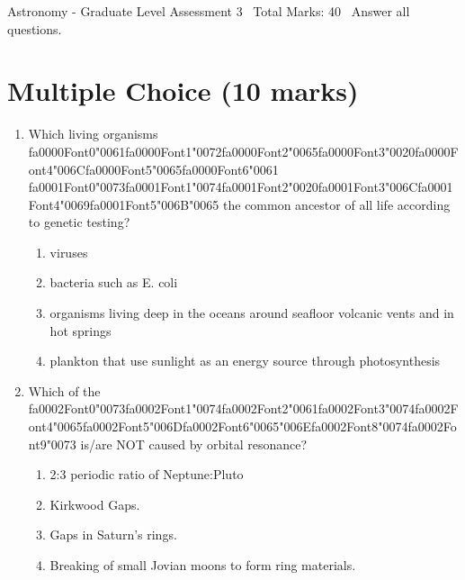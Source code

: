 \documentclass[12pt]{article}
\begin{document}
\begin{center}
Astronomy - Graduate Level Assessment 3 \
Total Marks: 40 \
Answer all questions.
\end{center}

\section*{Multiple Choice (10 marks)}
\begin{enumerate}[label=\arabic*.]
\item Which living organisms {\csname fa0000Font0\endcsname\char"0061}{\csname fa0000Font1\endcsname\char"0072}{\csname fa0000Font2\endcsname\char"0065}{\csname fa0000Font3\endcsname\char"0020}{\csname fa0000Font4\endcsname\char"006C}{\csname fa0000Font5\endcsname\char"0065}{\csname fa0000Font6\endcsname\char"0061} {\csname fa0001Font0\endcsname\char"0073}{\csname fa0001Font1\endcsname\char"0074}{\csname fa0001Font2\endcsname\char"0020}{\csname fa0001Font3\endcsname\char"006C}{\csname fa0001Font4\endcsname\char"0069}{\csname fa0001Font5\endcsname\char"006B}{\char"0065} the common ancestor of all life according to genetic
testing?
\begin{enumerate}[label=(\alph*)]
    \item viruses
    \item bacteria such as E. coli
    \item organisms living deep in the oceans around seafloor volcanic vents and in hot springs
    \item plankton that use sunlight as an energy source through photosynthesis
\end{enumerate}
\item Which of the {\csname fa0002Font0\endcsname\char"0073}{\csname fa0002Font1\endcsname\char"0074}{\csname fa0002Font2\endcsname\char"0061}{\csname fa0002Font3\endcsname\char"0074}{\csname fa0002Font4\endcsname\char"0065}{\csname fa0002Font5\endcsname\char"006D}{\csname fa0002Font6\endcsname\char"0065}{\char"006E}{\csname fa0002Font8\endcsname\char"0074}{\csname fa0002Font9\endcsname\char"0073} is/are NOT caused by orbital resonance?
\begin{enumerate}[label=(\alph*)]
    \item 2:3 periodic ratio of Neptune:Pluto
    \item Kirkwood Gaps.
    \item Gaps in Saturn's rings.
    \item Breaking of small Jovian moons to form ring materials.
\end{enumerate}

\end{enumerate}
\end{document}
